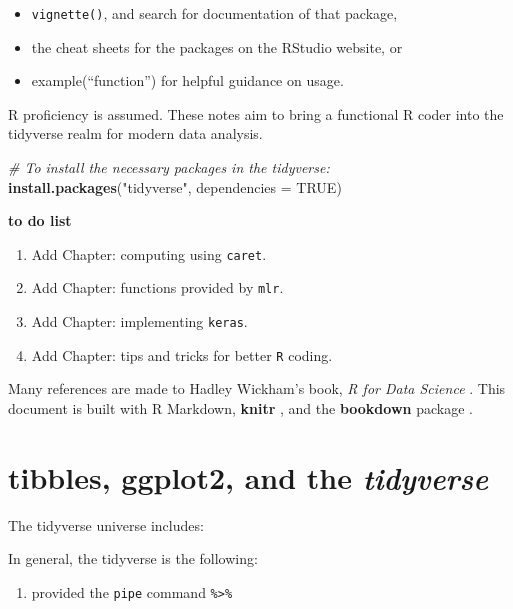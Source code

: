 \documentclass[]{book}
\newenvironment{Shaded}{\begin{snugshade}}{\end{snugshade}}
\newcommand{\KeywordTok}[1]{\textcolor[rgb]{0.13,0.29,0.53}{\textbf{#1}}}
\newcommand{\DataTypeTok}[1]{\textcolor[rgb]{0.13,0.29,0.53}{#1}}
\newcommand{\StringTok}[1]{\textcolor[rgb]{0.31,0.60,0.02}{#1}}
\newcommand{\CommentTok}[1]{\textcolor[rgb]{0.56,0.35,0.01}{\textit{#1}}}
\newcommand{\OtherTok}[1]{\textcolor[rgb]{0.56,0.35,0.01}{#1}}
\newcommand{\NormalTok}[1]{#1}
\providecommand{\tightlist}{%
  \setlength{\itemsep}{0pt}\setlength{\parskip}{0pt}}
\begin{document}
\begin{itemize}
\tightlist
\item
  \texttt{vignette()}, and search for documentation of that package,
\item
  the cheat sheets for the packages on the RStudio website, or
\item
  example(``function'') for helpful guidance on usage.
\end{itemize}

R proficiency is assumed. These notes aim to bring a functional R coder
into the tidyverse realm for modern data analysis.

\begin{Shaded}
\begin{Highlighting}[]
\CommentTok{# To install the necessary packages in the tidyverse:}
\KeywordTok{install.packages}\NormalTok{(}\StringTok{"tidyverse"}\NormalTok{, }\DataTypeTok{dependencies =} \OtherTok{TRUE}\NormalTok{)}
\end{Highlighting}
\end{Shaded}

\textbf{to do list}

\begin{enumerate}
\def\labelenumi{\arabic{enumi}.}
\tightlist
\item
  Add Chapter: computing using \texttt{caret}.
\item
  Add Chapter: functions provided by \texttt{mlr}.
\item
  Add Chapter: implementing \texttt{keras}.
\item
  Add Chapter: tips and tricks for better \texttt{R} coding.
\end{enumerate}

Many references are made to Hadley Wickham's book, \emph{R for Data
Science} \citep{wickham2016r}. This document is built with R Markdown,
\textbf{knitr} \citep{xie2015}, and the \textbf{bookdown} package
\citep{R-bookdown}.

\chapter{\texorpdfstring{tibbles, ggplot2, and the
\emph{tidyverse}}{tibbles, ggplot2, and the tidyverse}}\label{ch:intro}

The tidyverse universe includes:

In general, the tidyverse is the following:

\begin{enumerate}
\def\labelenumi{\arabic{enumi}.}
\tightlist
\item
  provided the \texttt{pipe} command \texttt{\%\textgreater{}\%}
\end{enumerate}
\end{document}
